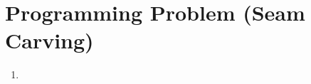\documentclass{article}
\begin{document}
\section{Programming Problem (Seam Carving)}
\begin{enumerate}
	\item 
	

\end{enumerate}
\end{document}
